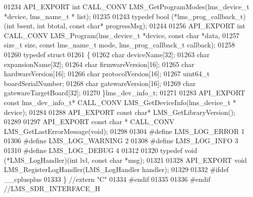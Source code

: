 \begin{DoxyCode}
01234 API_EXPORT \textcolor{keywordtype}{int} CALL_CONV LMS_GetProgramModes(lms\_device\_t *device, lms\_name\_t *
      list);
01235 
01243 \textcolor{keyword}{typedef} bool (*lms_prog_callback_t)(\textcolor{keywordtype}{int} bsent, \textcolor{keywordtype}{int} btotal, \textcolor{keyword}{const} \textcolor{keywordtype}{char}* progressMsg);
01244 
01256 API_EXPORT \textcolor{keywordtype}{int} CALL_CONV LMS_Program(lms\_device\_t *device, \textcolor{keyword}{const} \textcolor{keywordtype}{char} *data,
01257                 \textcolor{keywordtype}{size\_t} size, \textcolor{keyword}{const} lms\_name\_t mode, lms_prog_callback_t callback);
01258 
01260 \textcolor{keyword}{typedef} \textcolor{keyword}{struct}
01261 \{
01262     \textcolor{keywordtype}{char} deviceName[32];            
01263     \textcolor{keywordtype}{char} expansionName[32];         
01264     \textcolor{keywordtype}{char} firmwareVersion[16];       
01265     \textcolor{keywordtype}{char} hardwareVersion[16];       
01266     \textcolor{keywordtype}{char} protocolVersion[16];       
01267     uint64\_t boardSerialNumber;     
01268     \textcolor{keywordtype}{char} gatewareVersion[16];       
01269     \textcolor{keywordtype}{char} gatewareTargetBoard[32];   
01270 \}lms_dev_info_t;
01271 
01283 API_EXPORT \textcolor{keyword}{const} lms_dev_info_t* CALL_CONV LMS_GetDeviceInfo(lms\_device\_t *
      device);
01284 
01288 API_EXPORT \textcolor{keyword}{const} \textcolor{keywordtype}{char}* LMS_GetLibraryVersion();
01289 
01297 API_EXPORT \textcolor{keyword}{const} \textcolor{keywordtype}{char} * CALL_CONV LMS_GetLastErrorMessage(\textcolor{keywordtype}{void});
01298 
01304 \textcolor{preprocessor}{#define LMS\_LOG\_ERROR    1}
01306 \textcolor{preprocessor}{#define LMS\_LOG\_WARNING  2}
01308 \textcolor{preprocessor}{#define LMS\_LOG\_INFO     3}
01310 \textcolor{preprocessor}{#define LMS\_LOG\_DEBUG    4}
01312 
01320  \textcolor{keyword}{typedef} void (*LMS_LogHandler)(\textcolor{keywordtype}{int} lvl, \textcolor{keyword}{const} \textcolor{keywordtype}{char} *msg);
01321 
01328 API_EXPORT \textcolor{keywordtype}{void} LMS_RegisterLogHandler(LMS_LogHandler handler);
01329 
01332 \textcolor{preprocessor}{#ifdef \_\_cplusplus}
01333 \} \textcolor{comment}{//extern "C"}
01334 \textcolor{preprocessor}{#endif}
01335 
01336 \textcolor{preprocessor}{#endif //LMS\_SDR\_INTERFACE\_H}
\end{DoxyCode}

